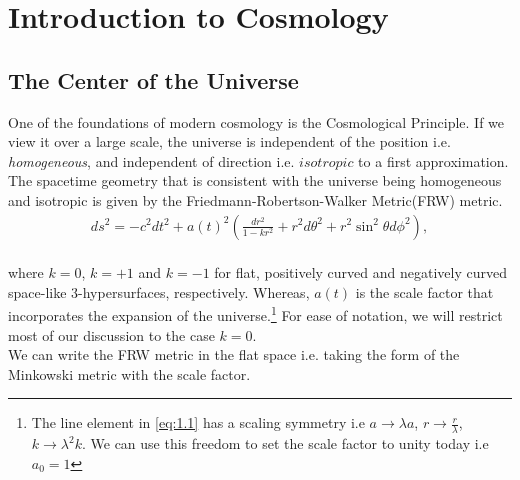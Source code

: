\chapter{Introduction to Cosmology}\label{introduction}
\justifying
\section{The Center of the Universe}

One of the foundations of modern cosmology is the Cosmological Principle. If we view it over a large scale, the universe is independent of the position i.e. \emph{homogeneous}, and independent of direction i.e. $isotropic$ to a first approximation.
The spacetime geometry that is consistent with the universe being homogeneous and isotropic is given by the Friedmann-Robertson-Walker Metric(FRW) metric.
\begin{align}
     ds^2= -c^2dt^2 + a(t)^2\left(\frac{dr^2}{1-k r^2}+ r^2d\theta^2 +r^2\sin^2\theta d\phi^2\right ),\label{eq:1.1}
\end{align}\\
where $k = 0$, $k = +1$ and 
$k = -1$ for flat, positively curved and negatively curved space-like $3$-hypersurfaces, respectively. Whereas, $a(t)$ is the scale factor that incorporates the expansion of the universe.\footnote{The line element in \eqref{eq:1.1} has a scaling symmetry i.e $a \rightarrow \lambda a$, $r \rightarrow \frac{r}{\lambda}$, $k \rightarrow \lambda^{2} k$. We can use this freedom to set the scale factor to unity today i.e $a_{0} =1$} For ease of notation, we will restrict most of our discussion to the case $k = 0$.
\hspace{0.5cm}\\
We can write the FRW metric in the flat space i.e. taking the form of the Minkowski metric with the scale factor.


